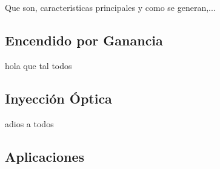 
Que son, caracteristicas principales y como se generan,...

	\subsection{Encendido por Ganancia}
		\label{Intr:OFC:GS}

		\nocite{principles}
		hola que tal todos

	\subsection{Inyección Óptica}

		adios a todos 

	\subsection{Aplicaciones}


